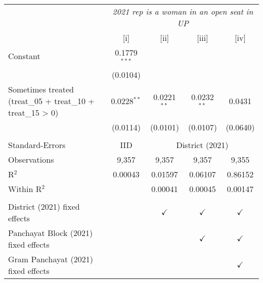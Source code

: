 
\begingroup
\centering
\begin{tabular}{lcccc}
   \toprule
    & \multicolumn{4}{c}{\textit{2021 rep is a woman in an open seat in UP}}\\
                                                                & [i]            & [ii]          & [iii]         & [iv]\\  
   \midrule 
   Constant                                                     & 0.1779$^{***}$ &               &               &   \\   
                                                                & (0.0104)       &               &               &   \\   
   Sometimes treated (treat\_05 + treat\_10 + treat\_15 > 0)    & 0.0228$^{**}$  & 0.0221$^{**}$ & 0.0232$^{**}$ & 0.0431\\   
                                                                & (0.0114)       & (0.0101)      & (0.0107)      & (0.0640)\\   
    \\
   Standard-Errors & IID & \multicolumn{3}{c}{District (2021)} \\ 
   Observations                                                 & 9,357          & 9,357         & 9,357         & 9,355\\  
   R$^2$                                                        & 0.00043        & 0.01597       & 0.06107       & 0.86152\\  
   Within R$^2$                                                 &                & 0.00041       & 0.00045       & 0.00147\\  
    \\
   District (2021) fixed effects                                &                & $\checkmark$  & $\checkmark$  & $\checkmark$\\   
   Panchayat Block (2021) fixed effects                         &                &               & $\checkmark$  & $\checkmark$\\   
   Gram Panchayat (2021) fixed effects                          &                &               &               & $\checkmark$\\   
   \bottomrule
\end{tabular}
\par\endgroup


